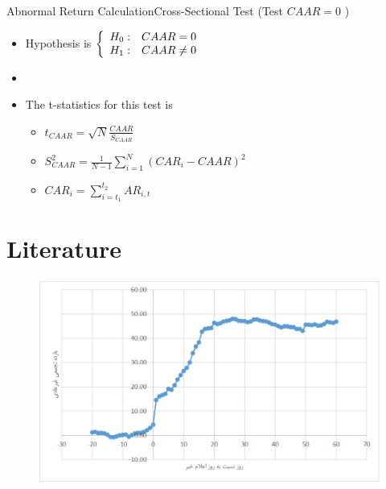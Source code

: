\documentclass{beamer}
\begin{document}
\begin{frame}{Abnormal Return Calculation}{Cross-Sectional Test (Test $ CAAR=0 $ )}
     
 \begin{itemize}
\item Hypothesis is  $\left\{\begin{array}{c c }
H_0: & CAAR=0\\
H_1: & CAAR\neq 0
\end{array}\right.
$\\
\item[]
\item The t-statistics for this test is 
\begin{itemize}
\item 
$
t_{CAAR} = \sqrt{N}\frac{CAAR}{S_{CAAR}}
$
\item 
$
S^2_{CAAR} = \frac{1}{N-1}\sum_{i = 1}^{N}(CAR_i - {CAAR})^2
$
\item
\scriptsize
 $ CAR_i = \sum_{i=t_1}^{t_2} AR_{i,t} $ 
\normalsize 
\end{itemize}
\end{itemize}

\end{frame}



\section{Literature}

\begin{frame}
\begin{figure}
\centering
\includegraphics[width=0.65\linewidth]{Soltani}
\label{Soltani}
\end{figure}
\end{frame}
\end{document}
